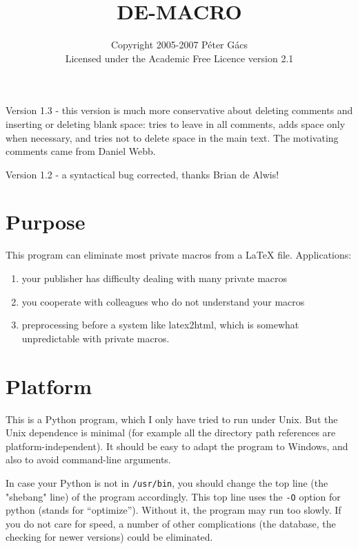 \documentclass[11pt]{article}
\begin{document}
 \title{DE-MACRO}

 \author{Copyright 2005-2007 P\'eter G\'acs\\
Licensed under the Academic Free Licence version 2.1}

\maketitle

Version 1.3 - this version is much more conservative about deleting
              comments and inserting or deleting blank space: tries to
              leave in all comments, adds space only when necessary, and
              tries not to delete space in the main text.
              The motivating comments came from Daniel Webb.

Version 1.2 - a syntactical bug corrected, thanks Brian de Alwis!
 
 \section*{Purpose}

This program can eliminate most private macros from a LaTeX file.
Applications:
 \begin{enumerate}[--]
  \item your publisher has difficulty dealing with many private macros
  \item you cooperate with colleagues who do not understand your macros
  \item preprocessing before a system like latex2html, which is somewhat
    unpredictable with private macros.
 \end{enumerate}
 
 \section*{Platform}

This is a Python program, which I only have tried to run under Unix.  
But the Unix dependence is minimal (for example all the directory path
references are platform-independent).  
It should be easy to adapt the
program to Windows, and also to avoid command-line arguments.

In case your Python is not in \verb`/usr/bin`, you should change the
top line (the "shebang" line) of the program accordingly.
This top line uses the \verb`-O` option for python (stands for ``optimize'').
Without it, the program may run too slowly.  
If you do not care for speed,
a number of other complications (the database, the checking for newer
versions) could be eliminated.
\end{document}
